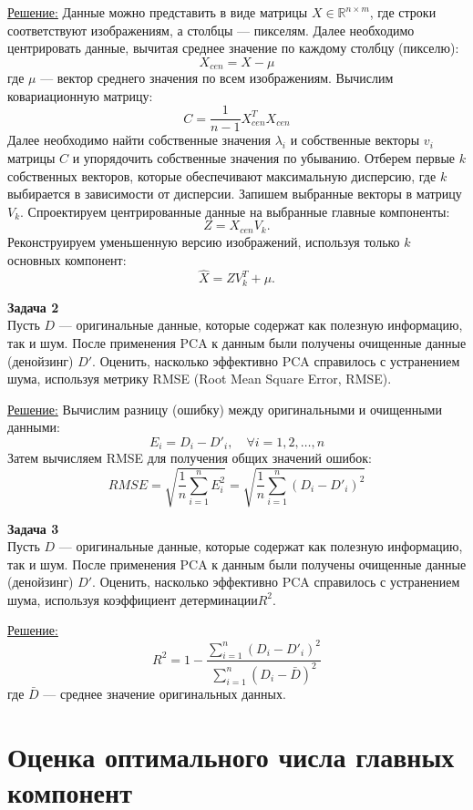 \underline{Решение:}
Данные можно представить в виде матрицы \( X \in \mathbb{R}^{n \times m} \), где строки соответствуют изображениям, а столбцы — пикселям. Далее необходимо центрировать данные, вычитая среднее значение по каждому столбцу (пикселю):
\[
    X_{cen} = X - \mu
\]
где \( \mu \) — вектор среднего значения по всем изображениям.
Вычислим ковариационную матрицу:
\[
    C = \frac{1}{n-1} X_{cen}^T X_{cen}
\]
Далее необходимо найти собственные значения \( \lambda_i \) и собственные векторы \( v_i \) матрицы \( C \) и упорядочить собственные значения по убыванию. Отберем первые \( k \) собственных векторов, которые обеспечивают максимальную дисперсию, где \( k \) выбирается в зависимости от дисперсии. Запишем выбранные векторы в матрицу \( V_k \).
Спроектируем центрированные данные на выбранные главные компоненты:
\[
    Z = X_{cen} V_k.
\]
Реконструируем уменьшенную версию изображений, используя только \( k \) основных компонент:
\[
    \hat{X} = Z V_k^T + \mu.
\]

\textbf{Задача 2}\\
Пусть \( D \) --- оригинальные данные, которые содержат как полезную информацию, так и шум. После применения PCA к данным были получены очищенные данные (денойзинг) \( D' \). Оценить, насколько эффективно PCA справилось с устранением шума, используя метрику RMSE (Root Mean Square Error, RMSE).

\underline{Решение:}
Вычислим разницу (ошибку) между оригинальными и очищенными данными:
\[
    E_{i} = D_{i} - D'_{i}, \quad \forall i = 1, 2, \ldots, n
\]
Затем вычисляем RMSE для получения общих значений ошибок:
\[
    RMSE = \sqrt{\frac{1}{n} \sum_{i=1}^{n} E_{i}^2} = \sqrt{\frac{1}{n} \sum_{i=1}^{n} (D_{i} - D'_{i})^2}
\]

\textbf{Задача 3}\\
Пусть \( D \) --- оригинальные данные, которые содержат как полезную информацию, так и шум. После применения PCA к данным были получены очищенные данные (денойзинг) \( D' \). Оценить, насколько эффективно PCA справилось с устранением шума, используя коэффициент детерминации\( R^2 \).

\underline{Решение:}
\[
    R^2 = 1 - \frac{\sum_{i=1}^{n} (D_{i} - D'_{i})^2}{\sum_{i=1}^{n} (D_{i} - \bar{D})^2}
\]
где \( \bar{D} \) — среднее значение оригинальных данных.

\section{Оценка оптимального числа главных компонент}
